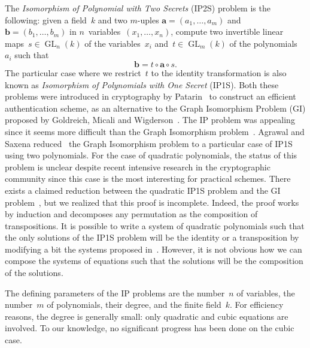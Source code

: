 \documentclass{lms}
\DeclareMathOperator\GL{GL}
\begin{document}
The \emph{Isomorphism of Polynomial with Two Secrets} (IP2S) problem is
the following: given a field~$k$ and two $m$-uples $\bm{a} = (a_1, …,
a_m)$ and~$\bm{b} = (b_1, …, b_m)$ in $n$~variables~$(x_1, …, x_n)$, compute
two invertible linear maps~$s ∈ \GL_n(k)$ of the variables~$x_i$
and~$t ∈ \GL_m(k)$ of the polynomials~$a_i$ such that
\begin{equation*}
\bm{b} = t ∘ \bm{a} ∘ s.
\end{equation*}
The particular case where we restrict~$t$ to the identity transformation
is also known as \emph{Isomorphism of Polynomials with One Secret}
(IP1S).
Both these problems were introduced in cryptography by
Patarin~\cite{DBLP:conf/eurocrypt/Patarin96} to construct an efficient
authentication scheme, 
as an alternative to the Graph Isomorphism Problem (GI) proposed by Goldreich, Micali and Wigderson~\cite{DBLP:journals/jacm/GoldreichMW91}.
The IP problem was appealing since 
it seems more difficult than the Graph Isomorphism problem~\cite{DBLP:conf/eurocrypt/PatarinGC98}. 
Agrawal and Saxena reduced~\cite{DBLP:conf/stacs/AgrawalS06} the Graph
Isomorphism problem to a particular case of IP1S using two polynomials.
For the case of quadratic polynomials, the status of this problem is unclear despite recent 
intensive research in the cryptographic community since this case is the most interesting 
for practical schemes. There exists a claimed reduction between the quadratic IP1S problem and the GI
problem~\cite{DBLP:conf/eurocrypt/PatarinGC98}, but we realized that this proof is incomplete. 
Indeed, the proof works by induction and decomposes any permutation as the composition of 
transpositions. It is possible to write a system of quadratic polynomials such that the only solutions 
of the IP1S problem will be the identity or a transposition by modifying a bit the systems proposed 
in~\cite{DBLP:conf/eurocrypt/PatarinGC98}. However, it is not obvious how we can compose the systems 
of equations such that the solutions will be the composition of the solutions. 

\bigbreak

The defining parameters of the IP problems are the number~$n$ of
variables, the number~$m$ of polynomials, their degree, and the finite
field~$k$.
For efficiency reasons, the degree is generally small:
only quadratic and cubic equations are involved.
To our knowledge, no significant progress has been done on the cubic case.
\end{document}
